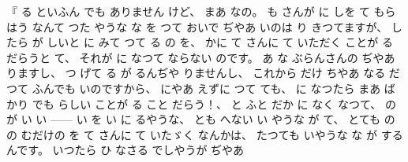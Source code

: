 %
『
る
といふん
でも
ありません
けど、
%
まあ
なの。
%
も
さんが
に
しを
て
もらはう
なんて
つた
やうな
な
を
%
つて
おいで
ぢやあ
いのは
り
きつてますが、
%
したら
が%
しいと
に
みて
つて
る
の
を、
%
かに
て
さんに
て
いただく%
ことが
る
だらうと
て、
%
それが
に
なつて
ならない
のです。
%
あ
な
ぶらんさんの
ぢやあ
りますし、
%
つ
げて
る
が
るんぢや
りませんし、
%
これから
だけ
ちやあ
なる
だつて
ふんでも
いのですから、
%
にやあ
えずに
つて
ても、
%
に
なつたら
まあ
%
ばかり
でも
らしい
ことが
る
こと
だらう！、
%
と
ふと
だか
に
なく
なつて、
%
の
が
い
い%
{---}{---}%
%
い
を
い
に
るやうな、
%
とも
へない
い
やうな
が
て、
%
とても
の%
の
むだけの
を
て
さんに
て
いたゞく
なんかは、
%
たつても
いやうな
な
が
するんです。
%
いつたら
ひ
なさる
でしやうが
ぢやあ
